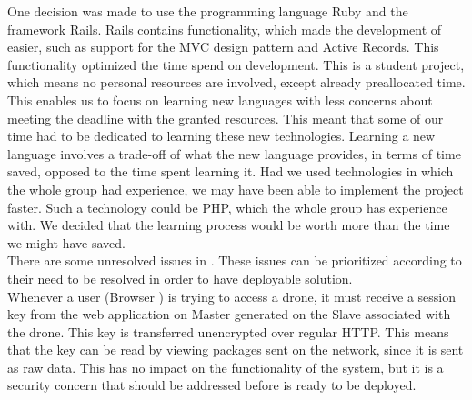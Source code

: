 One decision was made to use the programming language Ruby and the framework \ac{Rails}.
\acs{Rails} contains functionality, which made the development of \projectname{} easier, such as support for the \ac{MVC} design pattern and Active Records.
This functionality optimized the time spend on development.
This is a student project, which means no personal resources are involved, except already preallocated time.
This enables us to focus on learning new languages with less concerns about meeting the deadline with the granted resources.
This meant that some of our time had to be dedicated to learning these new technologies. %
Learning a new language involves a trade-off of what the new language provides, in terms of time saved, opposed to the time spent learning it. %
Had we used technologies in which the whole group had experience, we may have been able to implement the project faster.
Such a technology could be PHP, which the whole group has experience with.
We decided that the learning process would be worth more than the time we might have saved. \\

There are some unresolved issues in \projectname{}.
These issues can be prioritized according to their need to be resolved in order to have deployable solution. \\

Whenever a user (Browser ) is trying to access a drone, it must receive a session key from the web application on Master  generated on the Slave  associated with the drone.
This key is transferred unencrypted over regular HTTP.
This means that the key can be read by viewing packages sent on the network, since it is sent as raw data.
This has no impact on the functionality of the system, but it is a security concern that should be addressed before \projectname{} is ready to be deployed.

